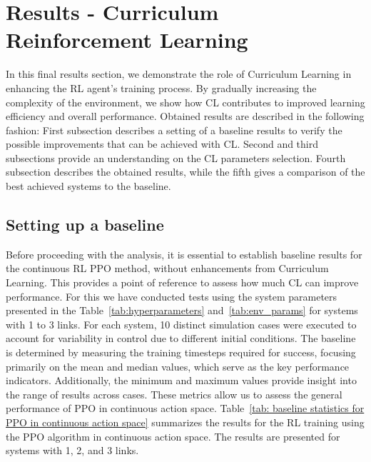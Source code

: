\section{Results - Curriculum Reinforcement Learning} \label{sec: Results - Curriculum Reinforcement Learning}

In this final results section, we demonstrate the role of Curriculum Learning in enhancing the RL agent’s training process. By gradually increasing the complexity of the environment, we show how CL contributes to improved learning efficiency and overall performance. Obtained results are described in the following fashion:
First subsection describes a setting of a baseline results to verify the possible improvements that can be achieved with CL. Second and third subsections provide an understanding on the CL parameters selection. Fourth subsection describes the obtained results, while the fifth gives a comparison of the best achieved systems to the baseline. 

\subsection{Setting up a baseline}

Before proceeding with the analysis, it is essential to establish baseline results for the continuous RL PPO method, without enhancements from Curriculum Learning. This provides a point of reference to assess how much CL can improve performance. For this we have conducted tests using the system parameters presented in the Table~\ref{tab:hyperparameters} and~\ref{tab:env_params} for systems with 1 to 3 links. For each system, 10 distinct simulation cases were executed to account for variability in control due to different initial conditions. The baseline is determined by measuring the training timesteps required for success, focusing primarily on the mean and median values, which serve as the key performance indicators. Additionally, the minimum and maximum values provide insight into the range of results across cases. These metrics allow us to assess the general performance of PPO in continuous action space. Table~\ref{tab: baseline statistics for PPO in continuous action space} summarizes the results for the RL training using the PPO algorithm in continuous action space. The results are presented for systems with 1, 2, and 3 links.

